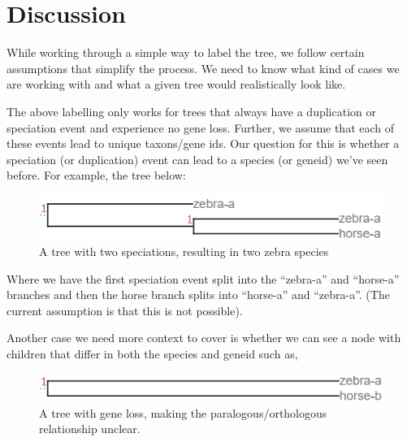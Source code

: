 \documentclass[
  11pt,
  letterpaper,
  oneside]{book}
\begin{document}
\hypertarget{discussion}{%
\section{Discussion}\label{discussion}}

While working through a simple way to label the tree, we follow certain
assumptions that simplify the process. We need to know what kind of
cases we are working with and what a given tree would realistically look
like.

The above labelling only works for trees that always have a duplication
or speciation event and experience no gene loss. Further, we assume that
each of these events lead to unique taxons/gene ids. Our question for
this is whether a speciation (or duplication) event can lead to a
species (or geneid) we've seen before. For example, the tree below:

\begin{figure}

{\centering \includegraphics{./figures/RepeatSpecExample.PNG}

}

\caption{A tree with two speciations, resulting in two zebra species}

\end{figure}

Where we have the first speciation event split into the ``zebra-a'' and
``horse-a'' branches and then the horse branch splits into ``horse-a''
and ``zebra-a''. (The current assumption is that this is not possible).

Another case we need more context to cover is whether we can see a node
with children that differ in both the species and geneid such as,

\begin{figure}

{\centering \includegraphics{./figures/AmbigousExample.PNG}

}

\caption{A tree with gene loss, making the paralogous/orthologous
relationship unclear.}

\end{figure}
\end{document}
